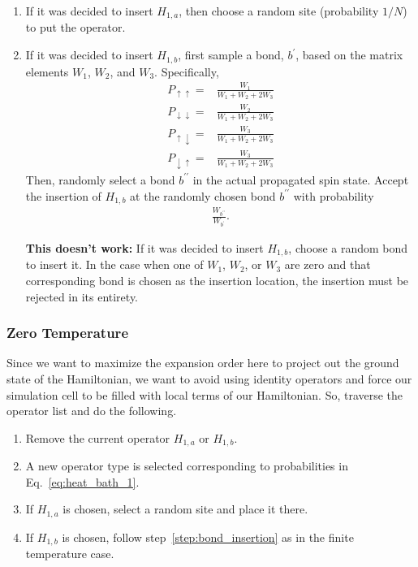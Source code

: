 \documentclass[12pt]{article}
\begin{document}
\begin{enumerate}
    \begin{subequations} \label{eq:heat_bath_1}
        \begin{align} 
            P_{H_{[1,a]_p}} = & \frac{Nh}{Nh + N_b\left(W_1 + W_2 + 2W_3\right)}, \\
            P_{H_{[1,b]_p}} = & \frac{N_b\left(W_1 + W_2 + 2W_3\right)}{Nh + N_b\left(W_1 + W_2 + 2W_3\right)}.
        \end{align}
    \end{subequations}
    \item If it was decided to insert $H_{1,a}$, then choose a random site (probability $1 / N$) to put the operator.
    \item If it was decided to insert $H_{1,b}$, first sample a bond, $b^\prime$, based on the matrix elements $W_1$, $W_2$, and $W_3$. \label{step:bond_insertion}
    Specifically, 
    \begin{align*}
        P_{\uparrow \uparrow} =& \frac{W_1}{W_1 + W_2 + 2W_3} \\
        P_{\downarrow \downarrow} =& \frac{W_2}{W_1 + W_2 + 2W_3} \\
        P_{\uparrow \downarrow} =& \frac{W_3}{W_1 + W_2 + 2W_3} \\
        P_{\downarrow \uparrow} =& \frac{W_3}{W_1 + W_2 + 2W_3}
    \end{align*}
    Then, randomly select a bond $b^{\prime\prime}$ in the actual propagated spin state.
    Accept the insertion of $H_{1,b}$ at the randomly chosen bond $b^{\prime\prime}$ with probability
    \begin{align*}
        \frac{W_{b^{\prime\prime}}}{W_{b^{\prime}}}.
    \end{align*}
                
    {\color{red} {\bf This doesn't work:}
    If it was decided to insert $H_{1,b}$, choose a random bond to insert it.
    In the case when one of $W_1$, $W_2$, or $W_3$ are zero and that corresponding bond is chosen as the insertion location, the insertion must be rejected in its entirety.}
\end{enumerate}

\subsubsection{Zero Temperature}

Since we want to maximize the expansion order here to project out the ground state of the Hamiltonian, we want to avoid using identity operators and force our simulation cell to be filled with local terms of our Hamiltonian.
So, traverse the operator list and do the following.
\begin{enumerate}
    \item Remove the current operator $H_{1,a}$ or $H_{1,b}$.
    \item A new operator type is selected corresponding to probabilities in Eq.~\eqref{eq:heat_bath_1}.
    \item If $H_{1,a}$ is chosen, select a random site and place it there.
    \item If $H_{1,b}$ is chosen, follow step~\ref{step:bond_insertion} as in the finite temperature case.
\end{enumerate}
\end{document}
